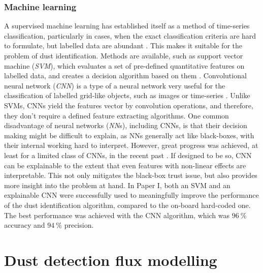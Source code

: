\subsubsection{Machine learning}

A supervised machine learning has established itself as a method of time-series classification, particularly in cases, when the exact classification criteria are hard to formulate, but labelled data are abundant \citep{wickstrom2022mixing}. This makes it suitable for the problem of dust identification. Methods are available, such as support vector machine (\textit{SVM}), which evaluates a set of pre-defined quantitative features on labelled data, and creates a decision algorithm based on them \citep{vapnik1997support}. Convolutional neural network (\textit{CNN}) is a type of a neural network very useful for the classification of labelled grid-like objects, such as images or time-series \citep{gu2018recent}. Unlike SVMs, CNNs yield the features vector by convolution operations, and therefore, they don't require a defined feature extracting algorithms. One common disadvantage of neural networks (\textit{NN}s), including CNNs, is that their decision making might be difficult to explain, as NNs generally act like black-boxes, with their internal working hard to interpret. However, great progress was achieved, at least for a limited class of CNNs, in the recent past \citep{samek2021explaining}. If designed to be so, CNN can be explainable to the extent that even features with non-linear effects are interpretable. This not only mitigates the black-box trust issue, but also provides more insight into the problem at hand. In Paper I, both an SVM and an explainable CNN were successfully used to meaningfully improve the performance of the dust identification algorithm, compared to the on-board hard-coded one. The best performance was achieved with the CNN algorithm, which was $\SI{96}{\%}$ accuracy and $\SI{94}{\%}$ precision.

\section{Dust detection flux modelling}

